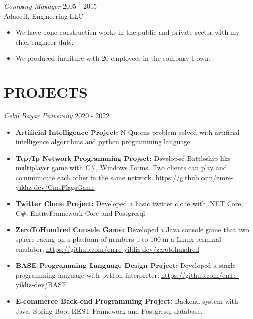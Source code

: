\documentclass[line,margin]{res}
\begin{document}
\begin{resume}
\begin{itemize}
                 
                {\sl Company Manager} \hfill        2005 - 2015 \\
                Adacelik Engineering LLC
                  \begin{itemize}
                   \item We have done construction works in the public and private sector with my chief engineer duty.
                     
                   \item We produced furniture with 20 employees in the company I own.
                   \end{itemize} 

\section{PROJECTS}{\sl Celal Bayar University} \hfill        2020 - 2022 \\
                  \begin{itemize}
                   \item \textbf{Artificial Intelligence Project: } N-Queens problem solved with artificial intelligence algorithms and python programming language. 
                   \item \textbf{Tcp/Ip Network Programming Project: } Developed Battleship like multiplayer game with C\#, Windows Forms. Two clients can play and communicate each other in the same network. \href{https://github.com/emre-yildiz-dev/CinsFlagsGame}{https://github.com/emre-yildiz-dev/CinsFlagsGame}
                   \item \textbf{Twitter Clone Project: } Developed a basic twitter clone with .NET Core, C\#, EntityFramework Core and Postgresql
                    \item \textbf{ZeroToHundred Console Game: } Developed a Java console game that two sphere racing on a platform of numbers 1 to 100 in a Linux terminal emulator. \href{https://github.com/emre-yildiz-dev/zerotohundred}{https://github.com/emre-yildiz-dev/zerotohundred} 
                     \item \textbf{BASE Programming Language Design Project: } Developed a single programming language with python interpreter. \href{https://github.com/emre-yildiz-dev/BASE}{https://github.com/emre-yildiz-dev/BASE}
                     \item \textbf{E-commerce Back-end Programming Project: } Backend system with Java, Spring Boot REST Framework and Postgresql database.
                      

\end{itemize}
\end{itemize}
\end{resume}
\end{document}
